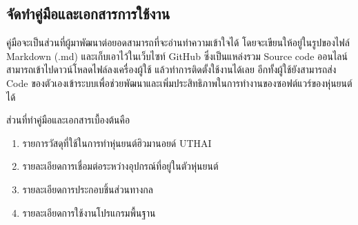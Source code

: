 
\clearpage
\subsection{จัดทำคู่มือและเอกสารการใช้งาน}
คู่มือจะเป็นส่วนที่ผู้มาพัฒนาต่อยอดสามารถที่จะอ่านทำความเข้าใจได้ โดยจะเขียนให้อยู่ในรูปของไฟล์ 
Markdown (.md) และเก็บเอาไว้ในเว็บไซท์ GitHub ซึ่งเป็นแหล่งรวม Source code ออนไลน์
สามารถเข้าไปดาวน์โหลดไฟล์ลงเครื่องผู้ใช้ แล้วทำการติดตั้งใช้งานได้เลย อีกทั้งผู้ใช้ยังสามารถส่ง Code
ของตัวเองเข้าระบบเพื่อช่วยพัฒนาและเพิ่มประสิทธิภาพในการทำงานของซอฟต์แวร์ของหุ่นยนต์ได้

ส่วนที่ทำคู่มือและเอกสารเบื้องต้นคือ\vspace{-5mm}
\begin{enumerate}[label=\arabic*, leftmargin=1.5cm]\setlength\itemsep{-0.25em}
	\item รายการวัสดุที่ใช้ในการทำหุ่นยนต์ฮิวมานอยด์ UTHAI
	\item รายละเอียดการเชื่อมต่อระหว่างอุปกรณ์ที่อยู่ในตัวหุ่นยนต์
	\item รายละเอียดการประกอบชิ้นส่วนทางกล
	\item รายละเอียดการใช้งานโปรแกรมพื้นฐาน
\end{enumerate}

